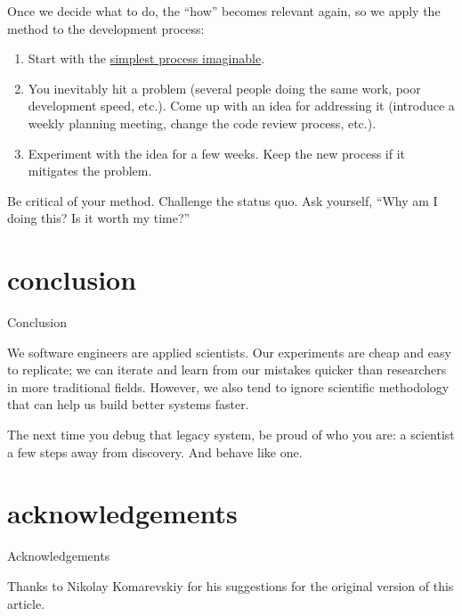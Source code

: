 \documentclass{article}
\begin{document}
Once we decide what to do, the ``how'' becomes relevant again,
so we apply the method to the development process:

\begin{enumerate}
\item Start with the \href{https://programming-motherfucker.com/}{simplest process imaginable}.
\item You inevitably hit a problem (several people doing the same work, poor development speed, etc.).
Come up with an idea for addressing it (introduce a weekly planning meeting, change the code review process, etc.).
\item Experiment with the idea for a few weeks.
Keep the new process if it mitigates the problem.
\end{enumerate}


Be critical of your method.
Challenge the status quo.
Ask yourself, ``Why am I doing this? Is it worth my time?''

\section{conclusion}{Conclusion}

We software engineers are applied scientists.
Our experiments are cheap and easy to replicate;
we can iterate and learn from our mistakes quicker than researchers in more traditional fields.
However, we also tend to ignore scientific methodology that can help us build better systems faster.

The next time you debug that legacy system, be proud of who you are: a scientist a few steps away from discovery.
And behave like one.

\section{acknowledgements}{Acknowledgements}

Thanks to Nikolay Komarevskiy for his suggestions for the original version of this article.
\end{document}
